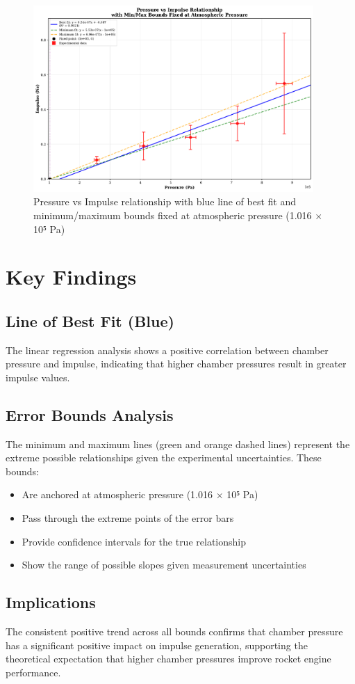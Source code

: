 \documentclass[12pt,a4paper]{article}
\begin{document}
\begin{figure}[H]
\centering
\includegraphics[width=0.95\textwidth]{pressure_vs_impulse_updated.pdf}
\caption{Pressure vs Impulse relationship with blue line of best fit and minimum/maximum bounds fixed at atmospheric pressure (1.016 × 10⁵ Pa)}
\label{fig:pressure_vs_impulse}
\end{figure}

\section{Key Findings}

\subsection{Line of Best Fit (Blue)}
The linear regression analysis shows a positive correlation between chamber pressure and impulse, indicating that higher chamber pressures result in greater impulse values.

\subsection{Error Bounds Analysis}
The minimum and maximum lines (green and orange dashed lines) represent the extreme possible relationships given the experimental uncertainties. These bounds:
\begin{itemize}
    \item Are anchored at atmospheric pressure (1.016 × 10⁵ Pa)
    \item Pass through the extreme points of the error bars
    \item Provide confidence intervals for the true relationship
    \item Show the range of possible slopes given measurement uncertainties
\end{itemize}

\subsection{Implications}
The consistent positive trend across all bounds confirms that chamber pressure has a significant positive impact on impulse generation, supporting the theoretical expectation that higher chamber pressures improve rocket engine performance.
\end{document}

